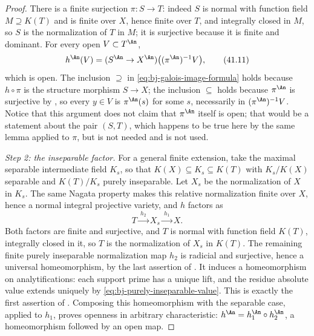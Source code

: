 \begin{proof}
There is a finite surjection $\pi:S\to T$: indeed $S$ is normal with
function field $M\supseteq K(T)$ and is finite over $X$, hence finite
over $T$, and integrally closed in $M$, so $S$ is the normalization of
$T$ in $M$; it is surjective because it is finite and dominant.  For
every open
$V\subset T^{\An}$,
\[
 h^{\An}(V)
   =(S^{\An}\to X^{\An})\bigl((\pi^{\An})^{-1}V\bigr),
\tag{41.11}\label{eq:bj-galois-image-formula}
\]
which is open.  The inclusion $\supseteq$ in
\eqref{eq:bj-galois-image-formula} holds because $h\circ\pi$ is the
structure morphism $S\to X$; the inclusion $\subseteq$ holds because
$\pi^{\An}$ is surjective by , so every
$y\in V$ is $\pi^{\An}(s)$ for some $s$, necessarily in
$(\pi^{\An})^{-1}V$.  Notice that this argument does not claim that
$\pi^{\An}$ itself is open; that would be a statement about the pair
$(S,T)$, which happens to be true here by the same lemma applied to
$\pi$, but is not needed and is not used.

\medskip
\noindent\emph{Step 2: the inseparable factor.}
For a general finite extension, take the maximal separable intermediate
field $K_s$, so that $K(X)\subseteq K_s\subseteq K(T)$ with
$K_s/K(X)$ separable and $K(T)/K_s$ purely inseparable.  Let $X_s$ be
the normalization of $X$ in $K_s$.  The same Nagata property makes
this relative normalization finite over $X$, hence a normal integral
projective variety, and $h$ factors as
\[
 T\xrightarrow{\ h_2\ }X_s\xrightarrow{\ h_1\ }X .
\]
Both factors are finite and surjective, and $T$ is normal with function
field $K(T)$, integrally closed in it, so $T$ is the normalization of
$X_s$ in $K(T)$.
The remaining finite purely inseparable normalization map $h_2$ is
radicial and surjective, hence a universal homeomorphism, by the last
assertion of .  It induces a
homeomorphism on analytifications: each support prime has a unique lift,
and the residue absolute value extends uniquely by
\eqref{eq:bj-purely-inseparable-value}.  This is exactly the first
assertion of .  Composing this homeomorphism
with the separable case, applied to $h_1$, proves openness in arbitrary
characteristic: $h^{\An}=h_1^{\An}\circ h_2^{\An}$, a homeomorphism
followed by an open map.


\end{proof}
